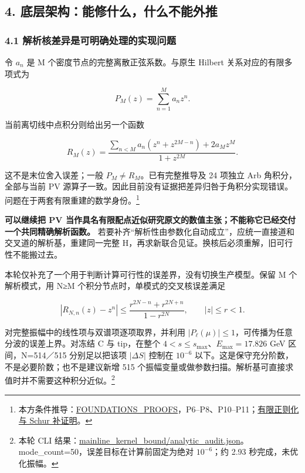 \documentclass[
  11pt,
  a4paper,
]{article}
\begin{document}
\subsection{4.
底层架构：能修什么，什么不能外推}\label{ux5e95ux5c42ux67b6ux6784ux80fdux4feeux4ec0ux4e48ux4ec0ux4e48ux4e0dux80fdux5916ux63a8}

\subsubsection{4.1
解析核差异是可明确处理的实现问题}\label{ux89e3ux6790ux6838ux5deeux5f02ux662fux53efux660eux786eux5904ux7406ux7684ux5b9eux73b0ux95eeux9898}

令 \(a_n\) 是 M 个密度节点的完整离散正弦系数。与原生 Hilbert
关系对应的有限多项式为

\[
P_M(z)=\sum_{n=1}^{M}a_nz^n.
\]

当前离切线中点积分则给出另一个函数

\[
R_M(z)=
\frac{\sum_{n<M}a_n(z^n+z^{2M-n})+2a_Mz^M}{1+z^{2M}}.
\]

这不是末位舍入误差；一般 \(P_M\ne R_M\)。已有完整推导及 24 项独立 Arb
角积分，全部与当前 PV
源算子一致。因此目前没有证据把差异归咎于角积分实现错误。问题在于两套有限重建的数学身份。\footnote{本方条件推导：\href{../../evidence/FOUNDATIONS_PROOFS_20260910.md}{FOUNDATIONS\_PROOFS}，P6--P8、P10--P11；\href{../../evidence/RHO_FINITE_MODEL_THEOREMS_20260910.md}{有限正则化与
  Schur 补证明}。}

\textbf{可以继续把 PV
当作具名有限配点近似研究原文的数值主张；不能称它已经交付一个共同精确解析函数。}
若要补齐``解析性由参数化自动成立''，应统一直接道和交叉道的解析基，重建同一完整
H，再求新联合见证。换核后必须重解，旧可行性不能搬过去。

本轮仅补充了一个用于判断计算可行性的误差界，没有切换生产模型。保留 M
个解析模式，用 N≥M 个积分节点时，单模式的交叉核误差满足

\[
|R_{N,n}(z)-z^n|
\le
\frac{r^{2N-n}+r^{2N+n}}{1-r^{2N}},
\qquad |z|\le r<1.
\]

对完整振幅中的线性项与双谱项逐项取界，并利用
\(|P_\ell(\mu)|\le1\)，可传播为任意分波的误差上界。对冻结 C 与
tip，在整个 \(4<s\le s_{\max}\)、\(E_{\max}=17.826\) GeV
区间，N=514／515 分别足以把该项 \(|\Delta S|\) 控制在 \(10^{-6}\)
以下。这是保守充分阶数，不是必要阶数；也不是建议新增 515
个振幅变量或做参数扫描。解析基可直接求值时并不需要这种积分近似。\footnote{本轮
  CLI
  结果：\url{mainline_kernel_bound/analytic_audit.json}。mode\_count=50，误差目标在计算前固定为绝对
  \(10^{-6}\)；约 2.93 秒完成，未优化振幅。}
\end{document}
